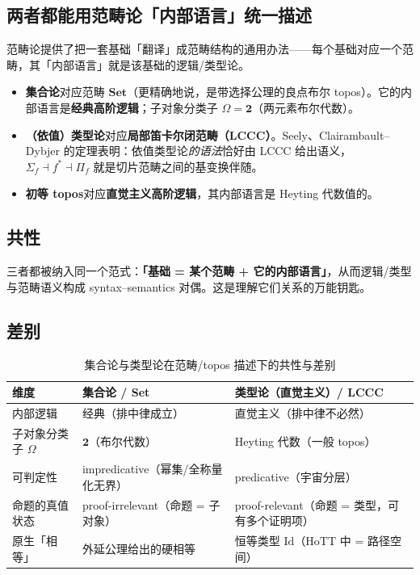 \documentclass[10pt, openany]{book}
\begin{document}
\subsection{两者都能用范畴论「内部语言」统一描述}

范畴论提供了把一套基础「翻译」成范畴结构的通用办法——每个基础对应一个范畴，其「内部语言」就是该基础的逻辑/类型论。

\begin{itemize}
  \item \textbf{集合论}对应范畴 $\mathbf{Set}$（更精确地说，是带选择公理的良点布尔 topos）。它的内部语言是\textbf{经典高阶逻辑}；子对象分类子 $\Omega = \mathbf{2}$（两元素布尔代数）。
  \item \textbf{（依值）类型论}对应\textbf{局部笛卡尔闭范畴（LCCC）}。Seely、Clairambault--Dybjer 的定理表明：依值类型论\emph{的语法}恰好由 LCCC 给出语义，$\Sigma_f\dashv f^{*}\dashv\Pi_f$ 就是切片范畴之间的基变换伴随。
  \item \textbf{初等 topos}对应\textbf{直觉主义高阶逻辑}，其内部语言是 Heyting 代数值的。
\end{itemize}

\subsection{共性}

三者都被纳入同一个范式：\textbf{「基础 = 某个范畴 + 它的内部语言」}，从而逻辑/类型与范畴语义构成 syntax--semantics 对偶。这是理解它们关系的万能钥匙。

\subsection{差别}

\begin{table}[h]
\centering
\begin{tabular}{|p{3.2cm}|p{3.6cm}|p{4.0cm}|}
\hline
\textbf{维度} & \textbf{集合论 / Set} & \textbf{类型论（直觉主义）/ LCCC} \\
\hline
内部逻辑 & 经典（排中律成立） & 直觉主义（排中律不必然） \\
\hline
子对象分类子 $\Omega$ & $\mathbf{2}$（布尔代数） & Heyting 代数（一般 topos） \\
\hline
可判定性 & impredicative（幂集/全称量化无界） & predicative（宇宙分层） \\
\hline
命题的真值状态 & proof-irrelevant（命题 = 子对象） & proof-relevant（命题 = 类型，可有多个证明项） \\
\hline
原生「相等」 & 外延公理给出的硬相等 & 恒等类型 $\mathrm{Id}$（HoTT 中 = 路径空间） \\
\hline
\end{tabular}
\caption{集合论与类型论在范畴/topos 描述下的共性与差别}
\end{table}
\end{document}
